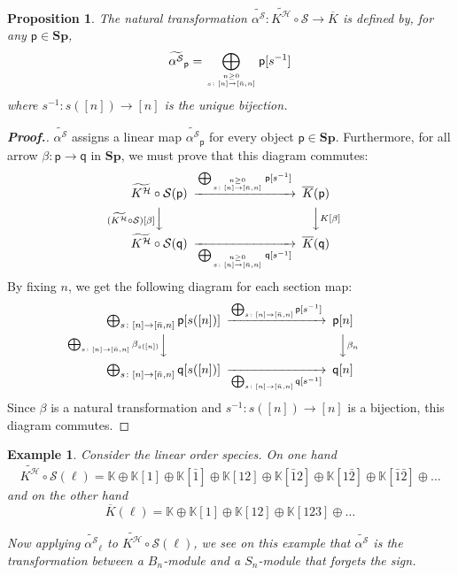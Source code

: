 \documentclass[11pt,reqno]{amsart}
\numberwithin{equation}{section}
\newtheorem{ex}[theorem]{Example}
\newtheorem{prop}[theorem]{Proposition}
\def\S{{\mathbb S}}
\def\K{{\mathbb K}}
\def\Sp{{\mathbf{Sp}}}
\def\H{{\mathcal{H}}}
\def\p{{\textsf{p}}}
\def\q{{\textsf{q}}}
\def\S{{\mathcal{S}}}
\def\Kb{\overline{K}}
\def\KBt{\widetilde{K^{\H}}}
\def\sn{s\colon [n]\rightarrow [\bar{n},n]}
\begin{document}
\begin{prop}
The natural transformation $\widetilde{\alpha^{\S}}:\KBt\circ \S\rightarrow \Kb$ is defined by, for any $\p\in\Sp$,
\begin{equation}
\widetilde{\alpha^{\S}}_{\p}=\bigoplus_{n\geq 0 \atop \sn}\p[s^{-1}]
\end{equation}
where $s^{-1}\colon s([n])\rightarrow [n]$ is the unique bijection.
\end{prop}
\begin{proof}[\bf Proof.]
$\widetilde{\alpha^{\S}}$ assigns a linear map $\widetilde{\alpha^{\S}}_{\p}$ for every object $\p\in\Sp$. Furthermore, for all arrow $\beta:\p\rightarrow \q$ in $\Sp$, we must prove that this diagram commutes:
\begin{equation}
\begin{CD}
\KBt\circ\S(\p) @>\bigoplus_{n\geq 0 \atop \sn}\p[s^{-1}]>> \Kb(\p) \\
@V (\KBt\circ\S)[\beta] VV @VVK[\beta]V\\
\KBt\circ\S(\q) @>>\bigoplus_{n\geq 0 \atop \sn}\q[s^{-1}]> \Kb(\q)
\end{CD}
\end{equation}
By fixing $n$, we get the following diagram for each section map:
\begin{equation}
\begin{CD}
\bigoplus_{\sn}\p[s([n])] @>\bigoplus_{\sn}\p[s^{-1}]>> \p[n] \\
@V \bigoplus_{\sn}\beta_{s([n])} VV @VV\beta_nV\\
\bigoplus_{\sn}\q[s([n])] @>>\bigoplus_{\sn}\q[s^{-1}]> \q[n]
\end{CD}
\end{equation}
Since $\beta$ is a natural transformation and $s^{-1}\colon s([n])\rightarrow [n]$ is a bijection, this diagram commutes.
\end{proof}


\begin{ex}
Consider the linear order species. On one hand
\begin{equation}
\KBt\circ \S(\ell) = \K\oplus \K[1]\oplus \K[\bar{1}]\oplus \K[12]\oplus \K[\bar{1}2]\oplus \K[1\bar{2}] \oplus \K[\bar{1}\bar{2}]\oplus \dots
\end{equation}
and on the other hand
\begin{equation}
\Kb(\ell)=\K\oplus\K[1]\oplus \K[12] \oplus \K[123] \oplus\dots
\end{equation}

Now applying $\widetilde{\alpha^{\S}}_{\ell}$ to $\KBt\circ \S (\ell)$, we see on this example that $\widetilde{\alpha^{\S}}$ is the transformation between a $B_n$-module
and a $S_n$-module that forgets the sign.
\end{ex}
\end{document}
